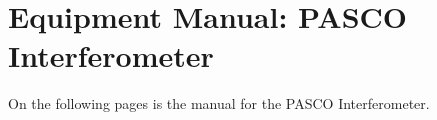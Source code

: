 \chapter{Equipment Manual: PASCO Interferometer}

On the following pages is the manual for the PASCO Interferometer.



